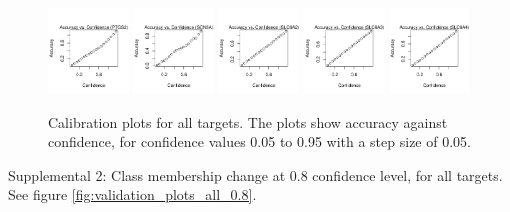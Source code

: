\documentclass[10pt,article]{memoir}
\begin{document}
\begin{figure}[h!]
\includegraphics[width=0.19\textwidth]{figures/calibration_plots/ptgs2_calib.pdf}
\includegraphics[width=0.19\textwidth]{figures/calibration_plots/scn5a_calib.pdf}
\includegraphics[width=0.19\textwidth]{figures/calibration_plots/slc6a2_calib.pdf}
\includegraphics[width=0.19\textwidth]{figures/calibration_plots/slc6a3_calib.pdf}
\includegraphics[width=0.19\textwidth]{figures/calibration_plots/slc6a4_calib.pdf}

    \caption{Calibration plots for all targets. The plots show accuracy against
        confidence, for confidence values 0.05 to 0.95 with a step size of 0.05.}
    \label{fig:calibration_plots_all}
\end{figure}

Supplemental 2: Class membership change at 0.8 confidence level, for all
targets. See figure \ref{fig:validation_plots_all_0.8}.
\end{document}
